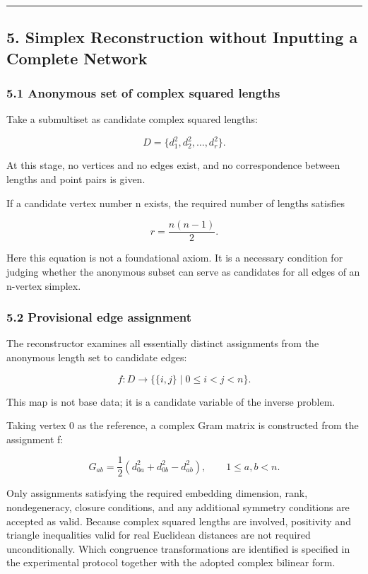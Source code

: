\documentclass[
  a4paper,
]{article}
\begin{document}
\begin{center}\rule{0.5\linewidth}{0.5pt}\end{center}

\subsection{5. Simplex Reconstruction without Inputting a Complete
Network}\label{simplex-reconstruction-without-inputting-a-complete-network}

\subsubsection{5.1 Anonymous set of complex squared
lengths}\label{anonymous-set-of-complex-squared-lengths}

Take a submultiset as candidate complex squared lengths:

\[
D
=
\{d_1^2,d_2^2,\ldots,d_r^2\}.
\]

At this stage, no vertices and no edges exist, and no correspondence
between lengths and point pairs is given.

If a candidate vertex number n exists, the required number of lengths
satisfies

\[
r
=
\frac{n(n-1)}{2}.
\]

Here this equation is not a foundational axiom. It is a necessary
condition for judging whether the anonymous subset can serve as
candidates for all edges of an n-vertex simplex.

\subsubsection{5.2 Provisional edge
assignment}\label{provisional-edge-assignment}

The reconstructor examines all essentially distinct assignments from the
anonymous length set to candidate edges:

\[
f:
D
\longrightarrow
\bigl\{\{i,j\}\mid 0\leq i<j<n\bigr\}.
\]

This map is not base data; it is a candidate variable of the inverse
problem.

Taking vertex 0 as the reference, a complex Gram matrix is constructed
from the assignment f:

\[
G_{ab}
=
\frac{1}{2}
\left(
d_{0a}^2+d_{0b}^2-d_{ab}^2
\right),
\qquad
1\leq a,b<n.
\]

Only assignments satisfying the required embedding dimension, rank,
nondegeneracy, closure conditions, and any additional symmetry
conditions are accepted as valid. Because complex squared lengths are
involved, positivity and triangle inequalities valid for real Euclidean
distances are not required unconditionally. Which congruence
transformations are identified is specified in the experimental protocol
together with the adopted complex bilinear form.
\end{document}
